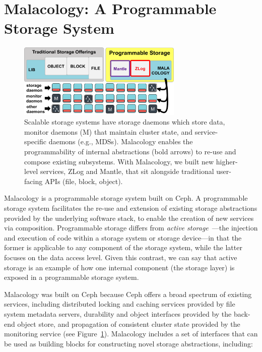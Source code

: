 \section{Malacology: A Programmable Storage System}

\begin{figure}[tb]
\centering
\includegraphics[width=0.7\textwidth]{./chapters/background/figures/overview.png}
\caption{Scalable storage systems have storage daemons which store data,
monitor daemons (M) that maintain cluster state, and service-specific daemons
({e.g.}, MDSs). Malacology enables the programmability of
internal abstractions (bold arrows) to re-use and compose existing subsystems.
With Malacology, we built new higher-level services, ZLog and Mantle, that sit
alongside traditional user-facing APIs (file, block,
object).}\label{fig:overview}
\end{figure}

Malacology is a programmable storage system built on Ceph. A programmable
storage system facilitates the re-use and extension of existing storage
abstractions provided by the underlying software stack, to enable the creation
of new services via composition.  Programmable storage differs from
\emph{active storage}~\cite{riedel:vldb98}---the injection and execution of
code within a storage system or storage device---in that the former is
applicable to any component of the storage system, while the latter focuses on
the data access level. Given this contrast, we can say that active storage is
an example of how one internal component (the storage layer) is exposed in a
programmable storage system.

Malacology was built on Ceph because Ceph offers a broad spectrum of existing
services, including distributed locking and caching services provided by file
system metadata servers, durability and object interfaces provided by the
back-end object store, and propagation of consistent cluster state provided by
the monitoring service (see Figure~\ref{fig:overview}).  Malacology includes a
set of interfaces that can be used as building blocks for constructing novel
storage abstractions, including:

